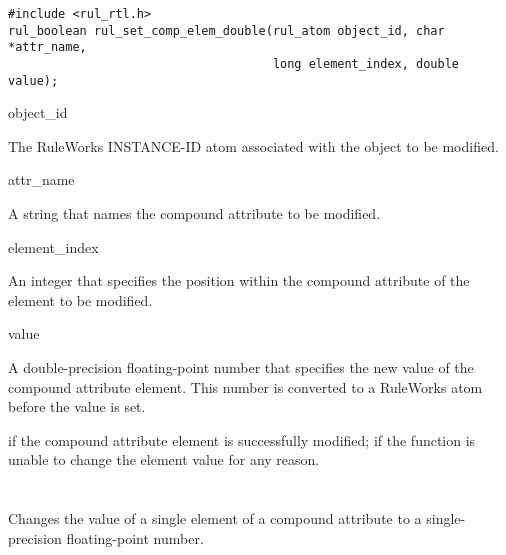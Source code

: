 \CBinding
\begin{verbatim}
#include <rul_rtl.h>
rul_boolean rul_set_comp_elem_double(rul_atom object_id, char *attr_name,
                                     long element_index, double value);
\end{verbatim}

\begin{arguments}
\item[object\_id]

  The RuleWorks INSTANCE-ID atom associated with the object to be
  modified.
         
\item[attr\_name]

  A string that names the compound attribute to be modified.

\item[element\_index]

  An integer that specifies the position within the compound attribute
  of the element to be modified.

\item[value]

  A double-precision floating-point number that specifies the new
  value of the compound attribute element.  This number is converted
  to a RuleWorks  atom before the value is set.
\end{arguments}

\ReturnValue

 if the compound attribute element is successfully modified;
 if the function is unable to change the element value for
any reason.

\begin{seealso}





\end{seealso}

\section*{}

Changes the value of a single element of a compound attribute to a
single-precision floating-point number.


